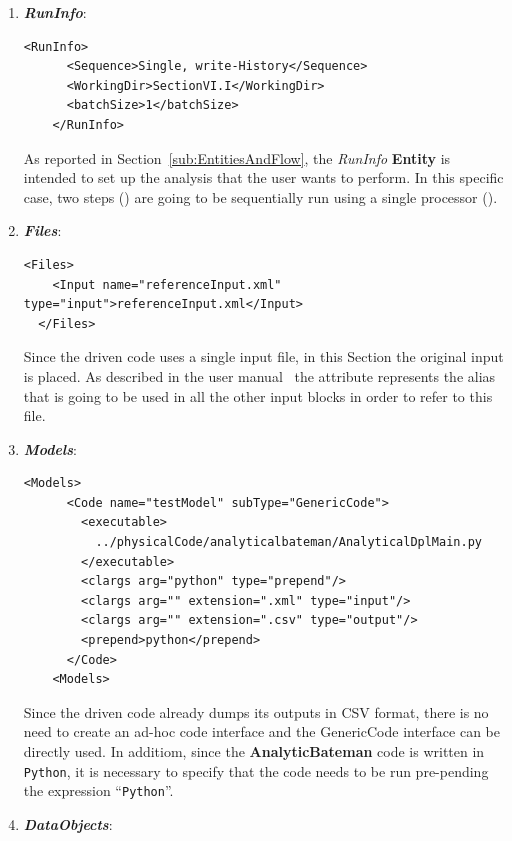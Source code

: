  \begin{enumerate}
   \item \textbf{\textit{RunInfo}}:
\begin{lstlisting}[style=XML,morekeywords={arg,extension,pauseAtEnd,overwrite}]
    <RunInfo>
      <Sequence>Single, write-History</Sequence>
      <WorkingDir>SectionVI.I</WorkingDir>
      <batchSize>1</batchSize>
    </RunInfo>   
\end{lstlisting}   
   As reported in Section~\ref{sub:EntitiesAndFlow}, the \textit{RunInfo} \textbf{Entity} is intended to set up the analysis 
   that the user wants to perform. In this specific case, two steps () are going to be sequentially run 
   using a single processor ().
   
   \item \textbf{\textit{Files}}:
\begin{lstlisting}[style=XML,morekeywords={arg,extension,pauseAtEnd,overwrite}]
  <Files>
    <Input name="referenceInput.xml" type="input">referenceInput.xml</Input>
  </Files>
\end{lstlisting}
   Since the driven code uses a single input file, in this Section the original input is placed. As described in the user manual~\cite{}
   the attribute   represents the alias that is going to be used in all the other input blocks in order to 
   refer to this file.
   \item \textbf{\textit{Models}}:
\begin{lstlisting}[style=XML,morekeywords={arg,extension,pauseAtEnd,overwrite}]
   <Models>
      <Code name="testModel" subType="GenericCode">
        <executable>
          ../physicalCode/analyticalbateman/AnalyticalDplMain.py
        </executable>
        <clargs arg="python" type="prepend"/>
        <clargs arg="" extension=".xml" type="input"/>
        <clargs arg="" extension=".csv" type="output"/>
        <prepend>python</prepend>
      </Code>
    <Models>
\end{lstlisting}
  Since the driven code already dumps its outputs in CSV format, there is no need to create
  an ad-hoc code interface and the GenericCode interface can be directly used. In additiom, since the \textbf{AnalyticBateman} code
  is written in \texttt{Python}, it is necessary to specify that the code needs to be run pre-pending the expression ``\texttt{Python}''. 
   \item \textbf{\textit{DataObjects}}:
\begin{lstlisting}[style=XML,morekeywords={arg,extension,pauseAtEnd,overwrite}]

\end{lstlisting}
\end{enumerate}
